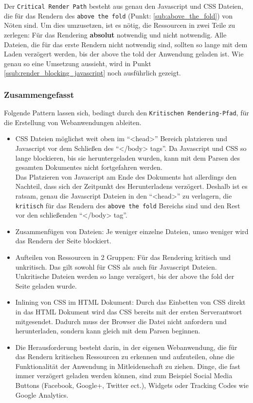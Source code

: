 			Der \texttt{Critical Render Path} besteht aus genau den Javascript und CSS Dateien, die für das Rendern des \texttt{above the fold} (Punkt: \ref{sub:above_the_fold}) von Nöten sind. Um dies umzusetzen, ist es nötig, die Ressourcen in zwei Teile zu zerlegen: Für das Rendering \textbf{absolut} notwendig und nicht notwendig. Alle Dateien, die für das erste Rendern nicht notwendig sind, sollten so lange mit dem Laden verzögert werden, bis der above the told der Anwendung geladen ist. Wie genau so eine Umsetzung aussieht, wird in Punkt \ref{ssub:render_blocking_javascript} noch ausführlich gezeigt.


		\subsubsection{Zusammengefasst} %
		\label{ssub:zusammengefasst_render_path}
		  Folgende Pattern lassen sich, bedingt durch den \texttt{Kritischen Rendering-Pfad}, für die Erstellung von Webanwendungen ableiten.

			\begin{itemize}
				\item CSS Dateien möglichst weit oben im "`<head>"' Bereich platzieren und Javascript vor dem Schließen des "`</body> tags"'. Da Javascript und CSS so lange blockieren, bis sie heruntergeladen wurden, kann mit dem Parsen des gesamten Dokumentes nicht fortgefahren werden. \autocite{placingScripts}\\
				Das Platzieren von Javascript am Ende des Dokuments hat allerdings den Nachteil, dass sich der Zeitpunkt des Herunterladens verzögert. Deshalb ist es ratsam, genau die Javascript Dateien in den "`<head>"' zu verlagern, die \texttt{kritisch} für das Rendern des \texttt{above the fold} Bereichs sind und den Rest vor den schließenden "`</body> tag"'. 

				\item Zusammenfügen von Dateien: Je weniger einzelne Dateien, umso weniger wird das Rendern der Seite blockiert.

				\item Aufteilen von Ressourcen in 2 Gruppen: Für das Rendering kritisch und unkritisch. Das gilt sowohl für CSS als auch für Javascript Dateien. Unkritische Dateien werden so lange verzögert, bis der above the fold der Seite geladen wurde.

				\item Inlining von CSS im HTML Dokument: Durch das Einbetten von CSS direkt in das HTML Dokument wird das CSS bereits mit der ersten Serverantwort mitgesendet. Dadurch muss der Browser die Datei nicht anfordern und herunterladen, sondern kann gleich mit dem Parsen beginnen.

				\item Die Herausforderung besteht darin, in der eigenen Webanwendung, die für das Rendern kritischen Ressourcen zu erkennen und aufzuteilen, ohne die Funktionalität der Anwendung in Mitleidenschaft zu ziehen. Dinge, die fast immer verzögert geladen werden können, sind zum Beispiel Social Media Buttons (Facebook, Google+, Twitter ect.), Widgets oder Tracking Codes wie Google Analytics.
			\end{itemize}

